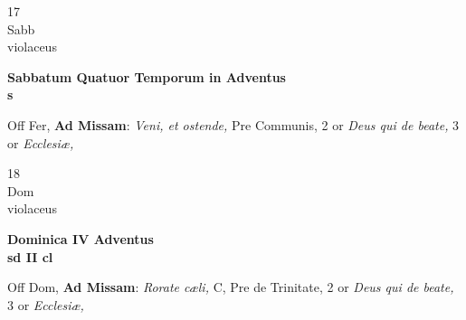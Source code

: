 \documentclass[10pt, openany]{book}
\begin{document}
        \begin{center}
            \begin{minipage}{3.5in}
                \vspace{2em}
                \begin{minipage}{0.5in}
                    {\Huge 17} \\
                    {\normalsize Sabb} \\
                    {\normalsize violaceus}
                \end{minipage}
                \begin{minipage}{3.0in}
                    \textbf{ \large Sabbatum Quatuor Temporum in Adventus \\
                    \textnormal{\normalsize s}} \\ 
                \end{minipage}
                \begin{justify}Off Fer, \textbf{Ad Missam}: \textit{Veni, et ostende,} Pre Communis, 2 or \textit{Deus qui de beate,} 3 or \textit{Ecclesiæ,}   
                \end{justify}
            \end{minipage}
        \end{center}
    
        \begin{center}
            \begin{minipage}{3.5in}
                \vspace{2em}
                \begin{minipage}{0.5in}
                    {\Huge 18} \\
                    {\normalsize Dom} \\
                    {\normalsize violaceus}
                \end{minipage}
                \begin{minipage}{3.0in}
                    \textbf{ \large Dominica IV Adventus \\
                    \textnormal{\normalsize sd II cl}} \\ 
                \end{minipage}
                \begin{justify}Off Dom, \textbf{Ad Missam}: \textit{Rorate cæli,} C, Pre de Trinitate, 2 or \textit{Deus qui de beate,} 3 or \textit{Ecclesiæ,}   
                \end{justify}
            \end{minipage}
        \end{center}
    
\end{document}
